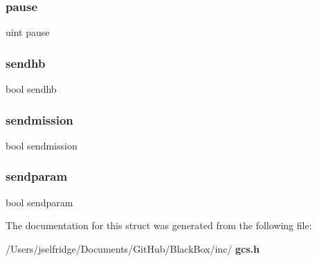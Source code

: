 \mbox{\label{structgcs__struct_a49703c563427213279e2fa9abbd4dee8}} 
\subsubsection{pause}
{\footnotesize\ttfamily uint pause}

\mbox{\label{structgcs__struct_a59cfe579f0eeb74e1c1a4c0fd722e942}} 
\subsubsection{sendhb}
{\footnotesize\ttfamily bool sendhb}

\mbox{\label{structgcs__struct_a3ef7f0803a4ed04f29ae788bd027a054}} 
\subsubsection{sendmission}
{\footnotesize\ttfamily bool sendmission}

\mbox{\label{structgcs__struct_ad76f6b05981c8f0e3a6da4b28d32f8e7}} 
\subsubsection{sendparam}
{\footnotesize\ttfamily bool sendparam}



The documentation for this struct was generated from the following file\+:\begin{DoxyCompactItemize}
\item 
/\+Users/jselfridge/\+Documents/\+Git\+Hub/\+Black\+Box/inc/\textbf{ gcs.\+h}\end{DoxyCompactItemize}
